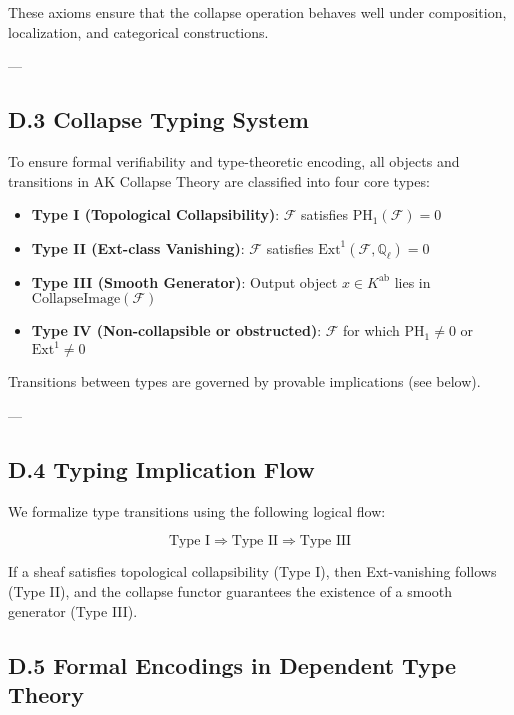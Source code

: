\documentclass[11pt]{article}
\begin{document}
These axioms ensure that the collapse operation behaves well under composition, localization, and categorical constructions.

---

\subsection*{D.3 Collapse Typing System}

To ensure formal verifiability and type-theoretic encoding, all objects and transitions in AK Collapse Theory are classified into four core types:

\begin{itemize}
    \item \textbf{Type I (Topological Collapsibility)}:  
    \( \mathcal{F} \) satisfies \( \mathrm{PH}_1(\mathcal{F}) = 0 \)
    
    \item \textbf{Type II (Ext-class Vanishing)}:  
    \( \mathcal{F} \) satisfies \( \mathrm{Ext}^1(\mathcal{F}, \mathbb{Q}_\ell) = 0 \)
    
    \item \textbf{Type III (Smooth Generator)}:  
    Output object \( x \in K^{\mathrm{ab}} \) lies in \( \text{CollapseImage}(\mathcal{F}) \)
    
    \item \textbf{Type IV (Non-collapsible or obstructed)}:  
    \( \mathcal{F} \) for which \( \mathrm{PH}_1 \ne 0 \) or \( \mathrm{Ext}^1 \ne 0 \)
\end{itemize}

Transitions between types are governed by provable implications (see below).

---

\subsection*{D.4 Typing Implication Flow}

We formalize type transitions using the following logical flow:

\[
\boxed{
\text{Type I} \Rightarrow \text{Type II} \Rightarrow \text{Type III}
}
\]

If a sheaf satisfies topological collapsibility (Type I), then Ext-vanishing follows (Type II), and the collapse functor guarantees the existence of a smooth generator (Type III).

\subsection*{D.5 Formal Encodings in Dependent Type Theory}
\end{document}
